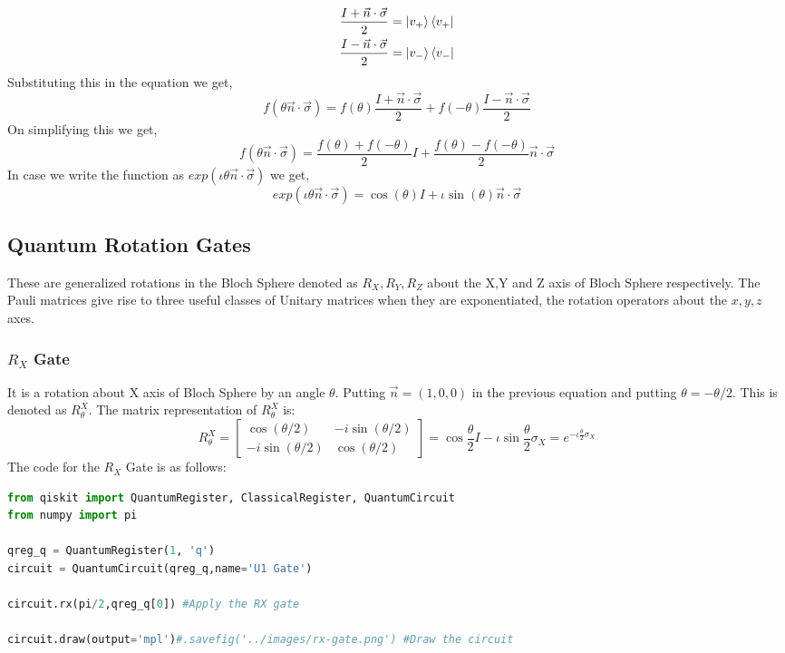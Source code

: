 \begin{example}
    \begin{align*}
    \frac{I+\vec{n}\cdot\vec{\sigma}}{2}&=\ket{v_+}\bra{v_+}\\
    \frac{I-\vec{n}\cdot\vec{\sigma}}{2}&=\ket{v_-}\bra{v_-}
    \end{align*}
    Substituting this in the equation we get,
    \[
    f(\theta\vec{n}\cdot\vec{\sigma})=f(\theta)\frac{I+\vec{n}\cdot\vec{\sigma}}{2}+f(-\theta)\frac{I-\vec{n}\cdot\vec{\sigma}}{2}
    \]
    On simplifying this we get,
    \[
    f(\theta\vec{n}\cdot\vec{\sigma})=\frac{f(\theta)+f(-\theta)}{2}I+\frac{f(\theta)-f(-\theta)}{2}\vec{n}\cdot\vec{\sigma}
    \]
    In case we write the function as $exp(\iota \theta\vec{n}\cdot\vec{\sigma})$ we get,
    \[
    exp(\iota\theta\vec{n}\cdot\vec{\sigma})=\cos(\theta)I+\iota\sin(\theta) \vec{n}\cdot\vec{\sigma}
    \]
    \end{example}


\subsection{Quantum Rotation Gates}
These are generalized rotations  in the Bloch Sphere 
denoted as $R_X,R_Y,R_Z$ about the X,Y and Z axis of Bloch Sphere respectively. The Pauli matrices give rise to three useful classes of Unitary matrices when they are exponentiated, the rotation operators about the $x,y,z$ axes.
\subsubsection{$R_X$ Gate}
It is a rotation about X axis of Bloch Sphere by an angle $\theta$. Putting $\vec{n}=(1,0,0)$ in the previous equation and putting $\theta=-\theta/2$. This is denoted
as $R^{X}_{\theta}$.
The matrix representation of $R^{X}_{\theta}$ is:
\[
    R^{X}_{\theta}=\begin{bmatrix}
        \cos(\theta/2) & -i\sin(\theta/2) \\
        -i\sin(\theta/2) & \cos(\theta/2)
    \end{bmatrix}=\cos \frac{\theta}{2}I-\iota \sin\frac{\theta}{2}\sigma_X=e^{-\iota\frac{\theta}{2}\sigma_X}
\]
The code for the $R_X$ Gate is as follows:
\begin{lstlisting}[language=Python]
from qiskit import QuantumRegister, ClassicalRegister, QuantumCircuit
from numpy import pi

qreg_q = QuantumRegister(1, 'q')
circuit = QuantumCircuit(qreg_q,name='U1 Gate')

circuit.rx(pi/2,qreg_q[0]) #Apply the RX gate

circuit.draw(output='mpl')#.savefig('../images/rx-gate.png') #Draw the circuit
\end{lstlisting}

